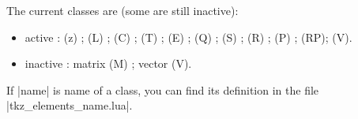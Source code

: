 The current classes are (some are still inactive):
\begin{itemize}
   \item active :  (z) ;   (L) ;  (C) ;  (T) ;  (E) ;  (Q) ;  (S) ;  (R) ;  (P) ;  (RP);  (V).
   
   \item  inactive : matrix (M) ; vector (V).

\end{itemize}

If |name| is name of a class, you can find its definition in the file |tkz_elements_name.lua|.

     


